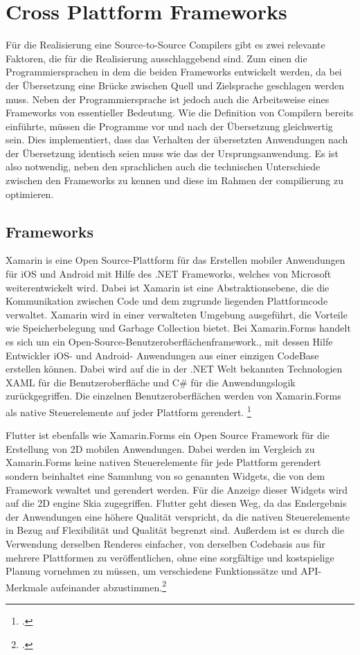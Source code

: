 \chapter{Cross Plattform Frameworks}
Für die Realisierung eine Source-to-Source Compilers gibt es zwei relevante Faktoren,  die für die Realisierung ausschlaggebend sind.  Zum einen die Programmiersprachen in dem die beiden Frameworks entwickelt werden,  da bei der Übersetzung eine Brücke zwischen Quell und Zielsprache geschlagen werden muss.  Neben der Programmiersprache ist jedoch auch die Arbeitsweise eines Frameworks von essentieller Bedeutung.  Wie die Definition von Compilern bereits einführte,  müssen die Programme vor und nach der Übersetzung gleichwertig sein.  Dies implementiert,  dass das Verhalten der übersetzten Anwendungen nach der Übersetzung identisch seien muss wie das der Ursprungsanwendung.  Es ist also notwendig,  neben den sprachlichen auch die technischen Unterschiede zwischen den Frameworks zu kennen und diese im Rahmen der compilierung zu optimieren. 

\section{Frameworks}
Xamarin is eine Open Source-Plattform für das Erstellen mobiler Anwendungen für iOS und Android mit Hilfe des .NET Frameworks, welches von Microsoft weiterentwickelt wird.  Dabei ist Xamarin ist eine Abstraktionsebene, die die Kommunikation zwischen Code und dem zugrunde liegenden Plattformcode verwaltet.  Xamarin wird in einer verwalteten Umgebung ausgeführt, die Vorteile wie Speicherbelegung und Garbage Collection bietet.  Bei Xamarin.Forms handelt es sich um ein Open-Source-Benutzeroberflächenframework., mit dessen Hilfe Entwickler iOS- und Android- Anwendungen aus einer einzigen CodeBase erstellen können.  Dabei wird auf die in der .NET Welt bekannten Technologien XAML  für die Benutzeroberfläche und C\# für die Anwendungslogik zurückgegriffen.  Die einzelnen Benutzeroberflächen werden von Xamarin.Forms als native Steuerelemente auf jeder Plattform gerendert.  \footcite[Vgl.][Abgerufen am 28.10.2020]{MicrosoftWhatIsXam2020}

Flutter ist ebenfalls wie Xamarin.Forms ein Open Source Framework für die Erstellung von 2D mobilen Anwendungen.  Dabei werden im Vergleich zu Xamarin.Forms keine nativen Steuerelemente für jede Plattform gerendert sondern beinhaltet eine Sammlung von so genannten Widgets, die von dem Framework vewaltet und gerendert werden.  Für die Anzeige dieser Widgets wird auf die 2D engine Skia zugegriffen.  Flutter geht diesen Weg,  da das Endergebnis der Anwendungen eine höhere Qualität verspricht, da die nativen Steuerelemente in Bezug auf Flexibilität und Qualität begrenzt sind.  Außerdem ist es durch die Verwendung derselben Renderes einfacher, von derselben Codebasis aus für mehrere Plattformen zu veröffentlichen,  ohne eine sorgfältige und kostspielige Planung vornehmen zu müssen,  um verschiedene Funktionssätze und API-Merkmale aufeinander abzustimmen.\footcite[Vgl.][Abgerufen am 28.10.2020]{GoogleFlutterFAQ2020}

